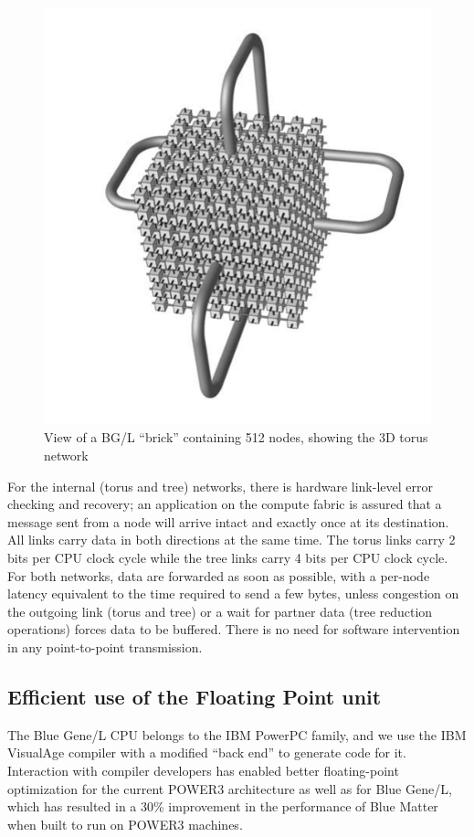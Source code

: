 \documentclass[doublespacing]{elsart}
\begin{document}
\begin{figure}
\includegraphics[keepaspectratio, width=\textwidth]{torus_dx}
\caption{View of a BG/L ``brick'' containing 512 nodes, showing the 3D
torus network}
\label{fig:brick}
\end{figure}

For the internal (torus and tree) networks, there is hardware
link-level error checking and recovery; an application on the compute
fabric is assured that a message sent from a node will arrive intact
and exactly once at its destination.  All links carry data in both
directions at the same time. The torus links carry 2 bits per CPU
clock cycle while the tree links carry 4 bits per CPU clock cycle.
For both networks, data are forwarded as soon as possible, with a
per-node latency equivalent to the time required to send a few bytes,
unless congestion on the outgoing link (torus and tree) or a wait for
partner data (tree reduction operations) forces data to be buffered.
There is no need for software intervention in any point-to-point
transmission.

\subsection{Efficient use of the Floating Point unit}
The Blue Gene/L CPU belongs to the IBM PowerPC family, and we use the IBM
VisualAge compiler with a modified ``back end'' to generate code for it.
Interaction with compiler developers has enabled better floating-point
optimization for the current POWER3 architecture as well as for Blue Gene/L,
which has resulted in a 30\% improvement in the performance of Blue Matter
when built to run on POWER3 machines.
\end{document}
